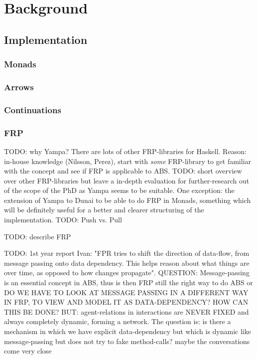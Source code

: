 \section{Background}

\subsection{Implementation}

\subsubsection{Monads}

\subsubsection{Arrows}

\subsubsection{Continuations}
 
\subsubsection{FRP}
TODO: why Yampa? There are lots of other FRP-libraries for Haskell. Reason: in-house knowledge (Nilsson, Perez), start with \textit{some} FRP-library to get familiar with the concept and see if FRP is applicable to ABS. TODO: short overview over other FRP-libraries but leave a in-depth evaluation for further-research out of the scope of the PhD as Yampa seems to be suitable. One exception: the extension of Yampa to Dunai to be able to do FRP in Monads, something which will be definitely useful for a better and clearer structuring of the implementation.
TODO: Push vs. Pull

TODO: describe FRP

TODO: 1st year report Ivan: "FPR tries to shift the direction of data-flow, from message passing onto data dependency. This helps reason about what things are over time, as opposed to how changes propagate". QUESTION: Message-passing is an essential concept in ABS, thus is then FRP still the right way to do ABS or DO WE HAVE TO LOOK AT MESSAGE PASSING IN A DIFFERENT WAY IN FRP, TO VIEW AND MODEL IT AS DATA-DEPENDENCY? HOW CAN THIS BE DONE?
BUT: agent-relations in interactions are NEVER FIXED and always completely dynamic, forming a network. The question is: is there a mechanism in which we have explicit data-dependency but which is dynamic like message-passing but does not try to fake method-calls? maybe the conversations come very close

